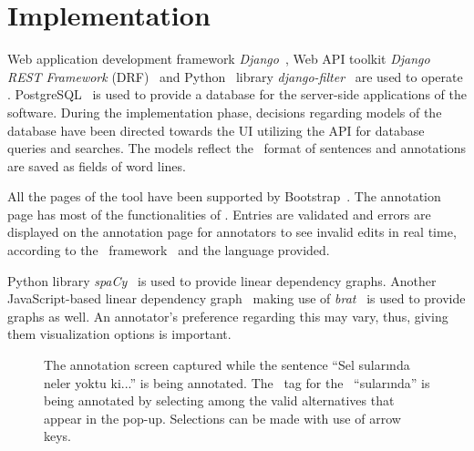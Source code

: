 \section{Implementation}
\label{sec:implementation}

Web application development framework \textit{Django}~\cite{django}, Web API toolkit \textit{Django REST Framework} (DRF)~\cite{drf} and Python~\cite{python} library \textit{django-filter}~\cite{django-filter} are used to operate \boatvtwo.
PostgreSQL~\cite{psql} is used to provide a database for the server-side applications of the software.
During the implementation phase, decisions regarding models of the database have been directed towards the UI utilizing the API for database queries and searches.
The models reflect the \ud\ format of sentences and annotations are saved as fields of word lines.

All the pages of the tool have been supported by Bootstrap~\cite{bootstrap}.
The annotation page has most of the functionalities of \boatvone.
Entries are validated and errors are displayed on the annotation page for annotators to see invalid edits in real time, according to the \ud\ framework~\cite{UD} and the language provided.

Python library \textit{spa\textsc{C}y}~\cite{spacy} is used to provide linear dependency graphs.
Another JavaScript-based linear dependency graph~\cite{spyssalo} making use of \textit{brat}~\cite{brat} is used to provide graphs as well.
An annotator's preference regarding this may vary, thus, giving them visualization options is important.

\begin{figure}[tbh]
    \centering
    \caption{The annotation screen captured while the sentence ``Sel sularında neler yoktu ki...'' is being annotated. The \deprel\ tag for the \form\ ``sularında'' is being annotated by selecting among the valid alternatives that appear in the pop-up. Selections can be made with use of arrow keys.}
    \label{fig:anno-fig}
\end{figure}

